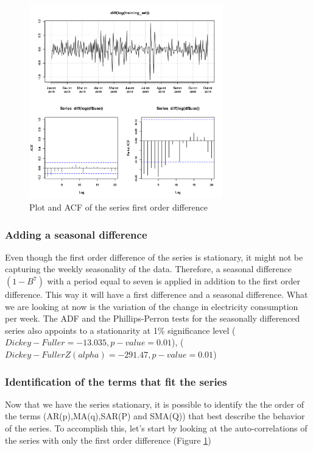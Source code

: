 \begin{figure}[!htb]
\begin{center}
\includegraphics[width=8.4cm]{first_difference_acf.png}    %
\caption{Plot and ACF of the series first order difference} 
\label{fig:first_difference_acf}
\end{center}
\end{figure}

 
\subsubsection{Adding a seasonal difference}
Even though the first order difference of the series is stationary, it might not be capturing the weekly seasonality of the data. Therefore, a seasonal difference $(1-B^7)$ with a period equal to seven is applied in addition to the first order difference. This way it will have a first difference and a seasonal difference. What we are looking at now is the variation of the change in electricity consumption  per week.  The ADF and the Phillips-Perron tests for the seasonally differenced series also appoints to a stationarity at 1\% significance level ($Dickey-Fuller = -13.035, p-value = 0.01$), ($Dickey-Fuller Z(alpha) = -291.47, p-value = 0.01$)

\subsubsection{Identification of the terms that fit the series}
Now that we have the series stationary, it is possible to identify the the order of the terms (AR(p),MA(q),SAR(P) and SMA(Q)) that best describe the behavior of the series. To accomplish this, let's start by looking at the auto-correlations of the series with only the first order difference (Figure \ref{fig:first_difference_acf})

